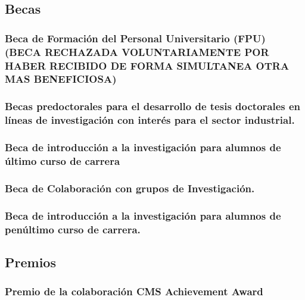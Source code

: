 \documentclass[a4paper, 11pt, twoside, openright]{report}
\begin{document}
\subsection{Becas}

\subsubsection{Beca de Formación del Personal Universitario (FPU) (BECA RECHAZADA VOLUNTARIAMENTE POR HABER RECIBIDO DE FORMA SIMULTANEA OTRA MAS BENEFICIOSA)}


\subsubsection{Becas predoctorales para el desarrollo de tesis doctorales en líneas de investigación con interés para el sector industrial.}


\subsubsection{Beca de introducción a la investigación para alumnos de último curso de carrera}


\subsubsection{Beca de Colaboración con grupos de Investigación.}


\subsubsection{Beca de introducción a la investigación para alumnos de penúltimo curso de carrera.}



\subsection{Premios}


\subsubsection{Premio de la colaboración CMS Achievement Award}

\end{document}
